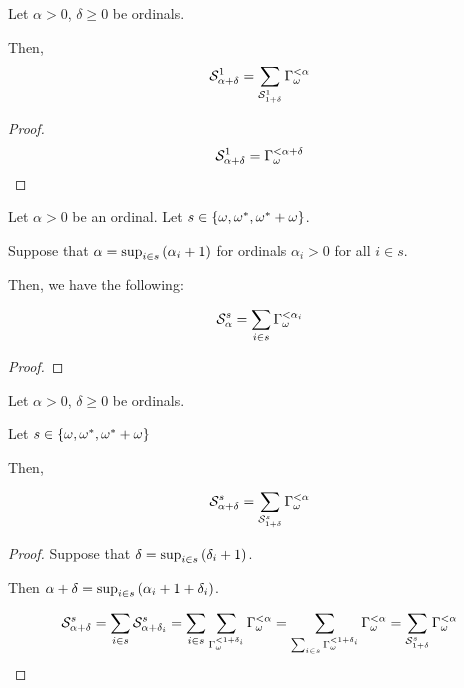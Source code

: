 \begin{corollary}
  Let $\alpha > 0$, $\delta \ge 0$ be ordinals.

  Then,
  \[
    \mathcal{S}^{1}_{\alpha + \delta}
    = \sum_{\mathcal{S}^{1}_{1 + \delta}}{\Gamma_{\omega}^{< \alpha}}
  \]
\end{corollary}

\begin{proof}
  \[
    \mathcal{S}^{1}_{\alpha + \delta}
    = \Gamma_{\omega}^{< \alpha + \delta}
  \]
\end{proof}

\begin{lemma}\label{b_alpha-structure-lemma-2}
  Let $\alpha > 0$ be an ordinal.
  Let $s \in \left\{ {\omega, \omega^\ast, \omega^\ast + \omega} \right\}$.

  Suppose that 
  $\alpha = \sup_{i \in s} \left( {\alpha_i + 1} \right)$ for 
  ordinals $\alpha_i > 0$ for all $i \in s$.

  Then, we have the following:

  \[
    \mathcal{S}^{s}_{\alpha} = \sum_{i \in s}{\Gamma_{\omega}^{< \alpha_i}}
  \]
\end{lemma}

\begin{proof}
  
\end{proof}

\begin{corollary}
  Let $\alpha > 0$, $\delta \ge 0$ be ordinals.

  Let $s \in \left\{ {\omega, \omega^\ast, \omega^\ast + \omega} \right\}$

  Then,

  \[
    \mathcal{S}^{s}_{\alpha + \delta}
    = \sum_{\mathcal{S}^{s}_{1 + \delta}}{\Gamma_{\omega}^{< \alpha}}
  \]
\end{corollary}

\begin{proof}
  Suppose that $\delta = \sup_{i \in s} \left( {\delta_i + 1} \right)$.

  Then $\alpha + \delta = \sup_{i \in s} \left( {\alpha_i + 1 + \delta_i} \right)$.

  \[
    \mathcal{S}^{s}_{\alpha + \delta}
    = \sum_{i \in s}{\mathcal{S}^{s}_{\alpha + \delta_i}}
    = \sum_{i \in s}\sum_{\Gamma_{\omega}^{< 1 + \delta_i}}{\Gamma_{\omega}^{< \alpha}}
    = \sum_{\sum_{i \in s}{\Gamma_{\omega}^{< 1 + \delta_i}}}{\Gamma_{\omega}^{< \alpha}}
    = \sum_{\mathcal{S}^{s}_{1 + \delta}}{\Gamma_{\omega}^{< \alpha}}
  \]
\end{proof}
